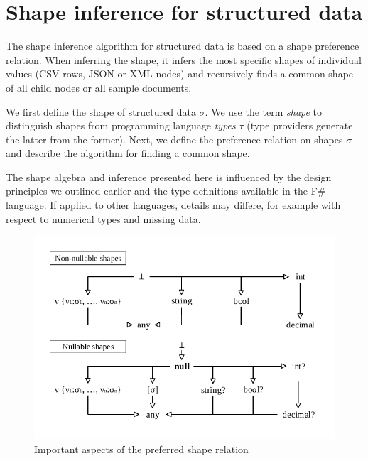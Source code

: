 \documentclass[10pt,preprint,blind,clearpagebib]{sigplanconf}
\begin{document}
\section{Shape inference for structured data}
\label{sec:inference}

The shape inference algorithm for structured data is based on a shape preference relation. When 
inferring the shape, it infers the most specific shapes of individual values (CSV rows, JSON or XML 
nodes) and recursively finds a common shape of all child nodes or all sample documents.

We first define the shape of structured data $\sigma$. We use the term \emph{shape} to distinguish 
shapes from programming language \emph{types} $\tau$ (type providers generate the latter from the former). 
Next, we define the preference relation on shapes $\sigma$ and describe the algorithm 
for finding a common shape. 

The shape algebra and inference presented here is influenced by the design principles
we outlined earlier and the type definitions available in the F\# language.
If applied to other languages, details may differe, for example
with respect to numerical types and missing data.


\begin{figure}
\begin{center}
\includegraphics[scale=0.80,trim=5mm 5mm 5mm 5mm,clip]{images/hierarchy.pdf} %
\end{center}
\vspace{-0.5em}
\caption{Important aspects of the preferred shape relation}
\label{fig:subtyping-diagram}
\vspace{-0.5em}
\end{figure}
\end{document}

